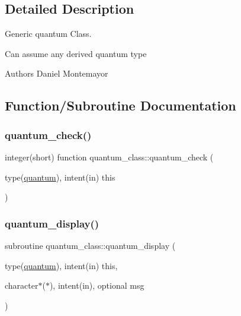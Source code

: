 \subsection{Detailed Description}
Generic quantum Class. 

Can assume any derived quantum type \begin{DoxyAuthor}{Authors}
Daniel Montemayor 
\end{DoxyAuthor}


\subsection{Function/\+Subroutine Documentation}
\mbox{\label{namespacequantum__class_a7ed38fd0b1d221dd04ca645722602f7d}} 
\subsubsection{\texorpdfstring{quantum\+\_\+check()}{quantum\_check()}}
{\footnotesize\ttfamily integer(short) function quantum\+\_\+class\+::quantum\+\_\+check (\begin{DoxyParamCaption}\item[{type(\hyperlink{structquantum__class_1_1quantum}{quantum}), intent(in)}]{this }\end{DoxyParamCaption})\hspace{0.3cm}{\ttfamily [private]}}

\mbox{\label{namespacequantum__class_a163174aa7cc6ae0a03b2269c55ca05b8}} 
\subsubsection{\texorpdfstring{quantum\+\_\+display()}{quantum\_display()}}
{\footnotesize\ttfamily subroutine quantum\+\_\+class\+::quantum\+\_\+display (\begin{DoxyParamCaption}\item[{type(\hyperlink{structquantum__class_1_1quantum}{quantum}), intent(in)}]{this,  }\item[{character$\ast$($\ast$), intent(in), optional}]{msg }\end{DoxyParamCaption})\hspace{0.3cm}{\ttfamily [private]}}

